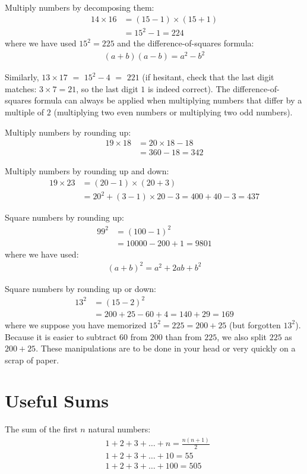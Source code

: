 \documentclass[12pt]{article}
\begin{document}
Multiply numbers by decomposing them:
\begin{align*}
14 \times 16
 & = (15-1) \times (15+1) \\
 & = 15^2 -1 = 224
\end{align*}
where we have used $15^2=225$ and the difference-of-squares formula:
\begin{align*}
(a+b) (a-b) = a^2 - b^2
\end{align*}

Similarly, $13 \times 17$ $=$ $15^2 -4$ $=$ $221$ (if hesitant, check that the last digit matches: $3\times7=21$, so the last digit $1$ is indeed correct).
The difference-of-squares formula can always be applied when multiplying numbers that differ by a multiple of $2$ (multiplying two even numbers or multiplying two odd numbers). 

Multiply numbers by rounding up:
\begin{align*}
19 \times 18
 & = 20 \times 18 - 18\\
 & = 360 - 18 = 342
\end{align*}

Multiply numbers by rounding up and down:
\begin{align*}
19 \times 23
 & = (20-1) \times (20+3) \\
 & = 20^2 + (3-1) \times 20 -3 = 400 + 40 - 3 = 437
\end{align*}

Square numbers by rounding up:
\begin{align*}
99^2 
 & = (100-1)^2 \\
 & = 10000 - 200 + 1 = 9801
\end{align*}
where we have used:
\begin{align*}
(a + b)^2 = a^2 + 2ab + b^2
\end{align*}

Square numbers by rounding up or down:
\begin{align*}
13^2 
 & = (15-2)^2 \\
 & = 200 + 25 - 60 + 4 = 140 + 29 = 169
\end{align*}
where we suppose you have memorized $15^2=225=200+25$ (but forgotten $13^2$). Because it is easier to subtract $60$ from $200$ than from $225$, we also split $225$ as $200+25$. These manipulations are to be done in your head or very quickly on a scrap of paper. 

\section*{Useful Sums}
The sum of the first $n$ natural numbers:
\begin{align*}
& 1+2+3+\ldots+n = \frac{n(n+1)}{2} \\
& 1+2+3+\ldots+10 = 55 \\
& 1+2+3+\ldots+100 = 505
\end{align*}
\end{document}
